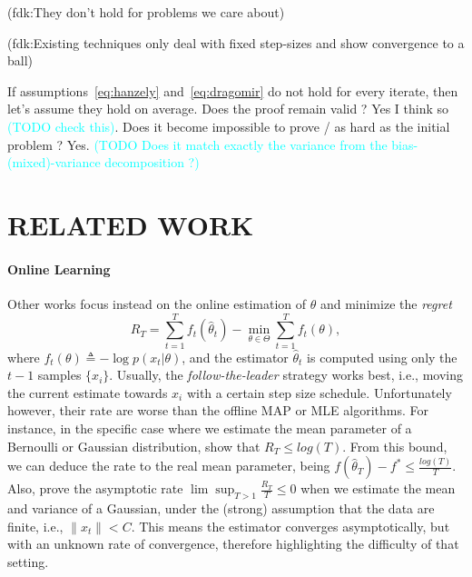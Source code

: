 \documentclass[twoside]{article}
\let\oldsection\section
\renewcommand{\section}[1]{\oldsection{\texorpdfstring{\uppercase{#1}}{#1}}}
\newcommand{\fdk}[1]{\textcolor{Periwinkle}{(fdk:#1)}}
\newcommand{\TODO}[1]{\textcolor{cyan}{(TODO #1)}}
\begin{document}
\fdk{They don't hold for problems we care about}

\fdk{Existing techniques only deal with fixed step-sizes and show convergence to a ball}

If assumptions~\eqref{eq:hanzely} and~\eqref{eq:dragomir} do not hold for every iterate, then let's assume they hold on average. Does the proof remain valid ? Yes I think so \TODO{check this}. Does it become impossible to prove / as hard as the initial problem ? Yes.
\TODO{Does it match exactly the variance from the bias-(mixed)-variance decomposition ?}

\section{Related Work}

\paragraph{Online Learning}
Other works focus instead on the online estimation of $\theta$ and minimize the \textit{regret}
\[
R_T=\sum_{t=1}^T f_t(\hat{\theta}_t)-\min_{\theta\in\Theta}\sum_{t=1}^Tf_t(\theta),
\]
where $f_t(\theta)\triangleq-\log p(x_t|\theta)$, and the estimator $\hat{\theta}_t$ is computed using only the $t-1$ samples $\{x_i\}$. Usually, the \textit{follow-the-leader} strategy works best, i.e., moving the current estimate towards $x_i$ with a certain step size schedule. Unfortunately however, their rate are worse than the offline MAP or MLE algorithms. For instance, in the specific case where we estimate the mean parameter of a Bernoulli or Gaussian distribution, \citet{azoury2001relative} show that $R_T\leq log(T)$. From this bound, we can deduce the rate  to the real mean parameter, being $f(\hat{\theta}_T)-f^*\leq \frac{log(T)}{T}$. Also, \citet{dasgupta2007online} prove the asymptotic rate $\lim\sup_{T>1}\frac{R_T}{T}\leq 0$ when we estimate the mean and variance of a Gaussian, under the (strong) assumption that the data are finite, i.e., $\|x_t\|<C$. This means the estimator converges asymptotically, but with an unknown rate of convergence, therefore highlighting the difficulty of that setting.
\end{document}
